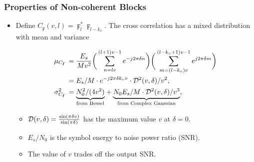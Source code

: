 \begin{frame}
  \frametitle{Properties of Non-coherent Blocks}

    \begin{itemize}
    
      \item Define $C_{\digamma}(v,l)=\digamma_l^*\digamma_{l-k_v}$. The cross correlation has a mixed distribution with mean and variance

      \begin{equation*}
        \begin{aligned}
        \label{eq:mean_var_product_coherent_int}
        \mu_{C_{\digamma}}&=\frac{E_s}{Mv^2}\bigg(\sum_{n=lv}^{(l+1)v-1}e^{-j2\pi \delta n}\bigg)\bigg(\sum_{m=(l-k_v)v}^{(l-k_v+1)v-1}e^{j2\pi \delta m}\bigg) \\
        &=E_s/M\cdot e^{-j2\pi \delta k_vv}\cdot\mathcal{D}^2(v,\delta)/v^2, \\
        \sigma^2_{C_{\digamma}}&={\underbrace{N_0^2/(4v^2)}_{\text{from Bessel}}}+{\underbrace{N_0E_s/M\cdot\mathcal{D}^2(v,\delta)/v^3}_{\text{from Complex Gaussian}}},
        \end{aligned}
      \end{equation*}

      \begin{itemize}
        \item $\mathcal{D}(v,\delta)=\frac{\sin(\pi \delta v)}{\sin(\pi\delta)}$ 
        has the maximum value $v$ at $\delta{=}0$.
        \item $E_s/N_0$ is the symbol energy to noise power ratio (SNR).
        \item The value of $v$ trades off the output SNR.
      \end{itemize}
    

    \end{itemize}



\end{frame}




      

